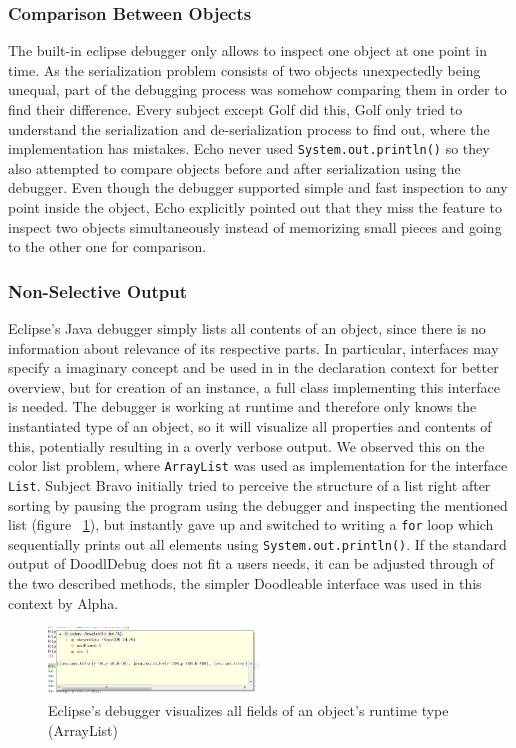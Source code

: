 \documentclass[english]{acm_proc_article-sp}
\newcommand{\nb}[2]{\nbc{#1}{#2}{orange}}
\newcommand\todo[1]{\nb{TO DO}{#1}}
\begin{document}
\subsubsection{Comparison Between Objects}
The built-in eclipse debugger only allows to inspect one object at one point in time. As the serialization problem consists of two objects unexpectedly  being unequal, part of the debugging process was somehow comparing them in order to find their difference. Every subject except Golf did this, Golf only tried to understand the serialization and de-serialization process to find out, where the implementation has mistakes. Echo never used \verb-System.out.println()- so they also attempted to compare objects before and after serialization using the debugger. Even though the debugger supported simple and fast inspection to any point inside the object, Echo explicitly pointed out that they miss the feature to inspect two objects simultaneously instead of memorizing small pieces and going to the other one for comparison.

\subsubsection{Non-Selective Output}
Eclipse's Java debugger simply lists all contents of an object, since there is no information about relevance of its respective parts. In particular, interfaces may specify a imaginary concept and be used in in the declaration context for better overview, but for creation of an instance, a full class implementing this interface is needed. The debugger is working at runtime and therefore only knows the instantiated type of an object, so it will visualize all properties and contents of this, potentially resulting in a overly verbose output. We observed this on the color list problem, where \verb.ArrayList. was used as implementation for the interface \verb.List.. Subject Bravo initially tried to perceive the structure of a list right after sorting by pausing the program  using the debugger and inspecting the mentioned list (figure ~\ref{debugger_color-list}), but instantly gave up and switched to writing a \verb.for. loop which sequentially prints out all elements using \verb-System.out.println()-. If the standard output of DoodlDebug does not fit a users needs, it can be adjusted through of the two described methods, the simpler Doodleable interface was used in this context by Alpha. \todo{Screenshot of Doodleable usage}
\begin{figure}[h]
	\includegraphics[width=0.5\textwidth]{img/debugger_color-list_remo.png}
	\caption[Bravo using the debugger for a color list]{Eclipse's debugger visualizes all fields of an object's runtime type (ArrayList)}
	\label{debugger_color-list}
\end{figure}
\end{document}
